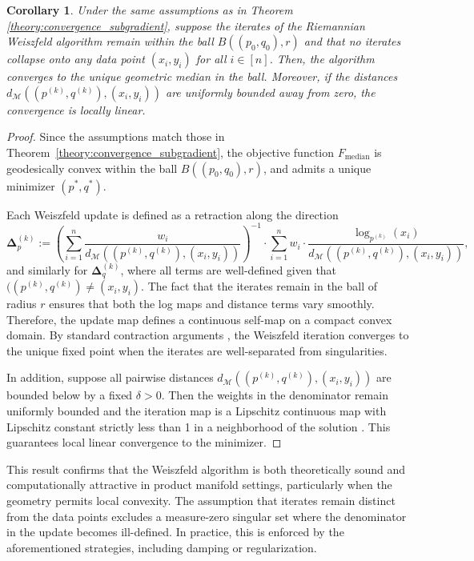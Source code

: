 \documentclass[10pt]{article}
\newtheorem{corollary}[theorem]{Corollary}
\newcommand{\calM}{\mathcal{M}}
\begin{document}
\begin{corollary}\label{theory:convergence_weiszfeld}
Under the same assumptions as in Theorem \ref{theory:convergence_subgradient}, suppose the iterates of the Riemannian Weiszfeld algorithm remain within the ball $B((p_0, q_0), r)$ and that no iterates collapse onto any data point $(x_i,y_i)$ for all $i\in[n]$. Then, the algorithm converges to the unique geometric median in the ball. Moreover, if the distances $d_\calM((p^{(k)},q^{(k)}), (x_i,y_i))$ are uniformly bounded away from zero, the convergence is locally linear.
\end{corollary}
\begin{proof}
Since the assumptions match those in Theorem~\ref{theory:convergence_subgradient}, the objective function \(F_{\text{median}}\) is geodesically convex within the ball \(B((p_0, q_0), r)\), and admits a unique minimizer \((p^*, q^*)\).

Each Weiszfeld update is defined as a retraction along the direction
\[
\boldsymbol{\Delta}_p^{(k)} := 
\left(\sum_{i=1}^n \frac{w_i}{d_\calM((p^{(k)}, q^{(k)}), (x_i, y_i))}\right)^{-1}\cdot 
\sum_{i=1}^n w_i \cdot \frac{\log_{p^{(k)}}(x_i)}{d_\calM((p^{(k)}, q^{(k)}), (x_i, y_i))}, \]
and similarly for \(\boldsymbol{\Delta}_q^{(k)}\), where all terms are well-defined given that $((p^{(k)}, q^{(k)}) \neq (x_i, y_i)$. The fact that the iterates remain in the ball of radius $r$ ensures that both the log maps and distance terms vary smoothly. Therefore, the update map defines a continuous self-map on a compact convex domain. By standard contraction arguments \citep{fletcher_2009_GeometricMedianRiemannian},  the Weiszfeld iteration converges to the unique fixed point when the iterates are well-separated from singularities.

In addition, suppose all pairwise distances \(d_\calM((p^{(k)}, q^{(k)}), (x_i, y_i))\) are bounded below by a fixed \(\delta > 0\). Then the  weights in the denominator remain uniformly bounded and the iteration map is a Lipschitz continuous map with Lipschitz constant strictly less than 1 in a neighborhood of the solution \citep{vardi_2000_MultivariateL1medianAssociated}. This guarantees local linear convergence to the minimizer.
\end{proof}

This result confirms that the Weiszfeld algorithm is both theoretically sound and computationally attractive in product manifold settings, particularly when the geometry permits local convexity. The assumption that iterates remain distinct from the data points excludes a measure-zero singular set where the denominator in the update becomes ill-defined. In practice, this is enforced by the aforementioned strategies, including damping or regularization.
\end{document}
